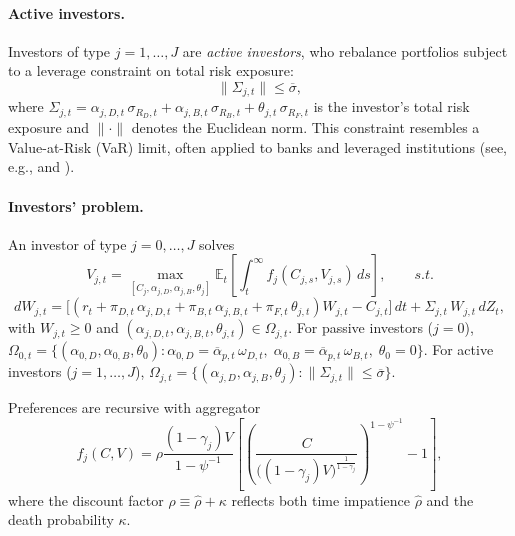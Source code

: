 \documentclass[12pt,english]{article}
\begin{document}
\paragraph{Active investors.} 

Investors of type $j = 1,\ldots, J$ are \textit{active investors}, who rebalance portfolios subject to a leverage constraint on total risk exposure:
\begin{equation}\label{eq:leverage_constraint}
    \|\Sigma_{j,t}\| \leq \overline{\sigma},
\end{equation}
where $\Sigma_{j,t} = \alpha_{j,D,t}\,\sigma_{R_D,t} + \alpha_{j,B,t}\,\sigma_{R_B,t} + \theta_{j,t}\,\sigma_{R_F,t}$ is the investor's total risk exposure and $\|\cdot\|$ denotes the Euclidean norm. This constraint resembles a Value-at-Risk (VaR) limit, often applied to banks and leveraged institutions (see, e.g., \citealt{adrian2014procyclical} and \citealt{brunnermeier2009market}).


\paragraph{Investors' problem.} 

An investor of type $j = 0,\ldots,J$ solves
\begin{equation}\label{eq:inv-problem}
    V_{j,t} = \max_{[C_j,\alpha_{j,D},\alpha_{j,B},\theta_j]} 
    \mathbb{E}_t \left[ \int_t^\infty f_j(C_{j,s},V_{j,s})\, ds \right], \qquad s.t.
\end{equation}
\begin{equation}\label{eq:budget_constraint}
dW_{j,t} = \big[(r_t + \pi_{D,t}\,\alpha_{j,D,t} + \pi_{B,t}\,\alpha_{j,B,t} + \pi_{F,t}\,\theta_{j,t}) W_{j,t} - C_{j,t}\big]\,dt 
    + \Sigma_{j,t}\, W_{j,t}\, dZ_t,
\end{equation}
with $W_{j,t} \geq 0$ and $(\alpha_{j,D,t}, \alpha_{j,B,t}, \theta_{j,t}) \in \Omega_{j,t}$. For passive investors ($j=0$),  
$\Omega_{0,t} = \{(\alpha_{0,D}, \alpha_{0,B}, \theta_0): \alpha_{0,D} = \overline{\alpha}_{p,t}\,\omega_{D,t},\; \alpha_{0,B} = \overline{\alpha}_{p,t}\,\omega_{B,t},\; \theta_0 = 0\}$. For active investors ($j=1,\ldots,J$),  
$\Omega_{j,t} = \{(\alpha_{j,D}, \alpha_{j,B}, \theta_j): \|\Sigma_{j,t}\| \leq \overline{\sigma}\}$. 

Preferences are recursive with aggregator  
\begin{equation}
    f_j(C,V) = \rho \frac{(1-\gamma_j) V}{1-\psi^{-1}} 
    \left[ \left( \frac{C}{\big((1-\gamma_j)V\big)^{\frac{1}{1-\gamma_j}}} \right)^{1-\psi^{-1}} - 1 \right],
\end{equation}
where the discount factor $\rho \equiv \hat{\rho}+\kappa$ reflects both time impatience $\hat{\rho}$ and the death probability $\kappa$.
\end{document}
